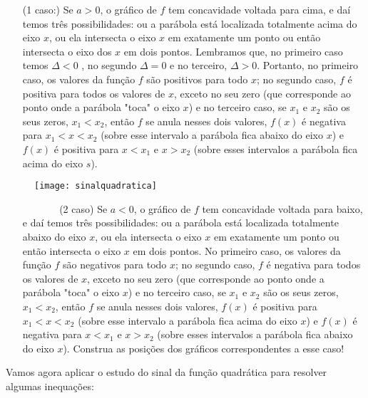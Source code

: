 \begin{itemize}


\item[(1\super{o} caso:)] Se $a>0$, o gráfico de $f$ tem concavidade voltada para cima, e daí temos três possibilidades: ou a parábola está localizada totalmente acima do eixo $x$, ou ela intersecta o eixo $x$ em exatamente um ponto ou então intersecta o eixo dos $x$ em dois pontos. Lembramos que, no primeiro caso temos $\Delta <0$ , no segundo $\Delta = 0$   e no terceiro, $\Delta >0$. Portanto, no primeiro caso, os valores da função $f$ são positivos para todo $x$; no segundo caso, $f$ é positiva para todos os valores de $x$, exceto no seu zero (que corresponde ao ponto onde a parábola "toca"{} o eixo $x$) e no terceiro caso, se $x_1$ e $x_2$ são os seus zeros, $x_1<x_2$, então $f$ se anula nesses dois valores, $f(x)$ é negativa para $x_1 < x < x_2$ (sobre esse intervalo a parábola fica abaixo do eixo $x$) e $f(x)$ é positiva para $x<x_1$ e $x> x_2$ (sobre esses intervalos a parábola fica acima do eixo $s$).


\end{itemize}

\begin{figure}[H]
\centering
\noindent\texttt{[image: sinalquadratica]}
\end{figure}

\begin{itemize}
\item[\textcolor{white}{............} (2\super{o} caso)] Se $a<0$, o gráfico de $f$ tem concavidade voltada para baixo, e daí temos três possibilidades: ou a parábola está localizada totalmente abaixo do eixo $x$, ou ela intersecta o eixo $x$ em exatamente um ponto ou então intersecta o eixo $x$ em dois pontos. No primeiro caso, os valores da função $f$ são negativos para todo $x$; no segundo caso, $f$ é negativa para todos os valores de $x$, exceto no seu zero (que corresponde ao ponto onde a parábola "toca"{} o eixo $x$) e no terceiro caso, se $x_1$ e $x_2$ são os seus zeros, $x_1<x_2$, então $f$ se anula nesses dois valores, $f(x)$ é positiva para $x_1 < x < x_2$ (sobre esse intervalo a parábola fica acima do eixo $x$) e $f(x)$ é negativa para $x<x_1$ e $x> x_2$ (sobre esses intervalos a parábola fica abaixo do eixo $x$). Construa as posições dos gráficos correspondentes a esse caso!


\end{itemize}
Vamos agora aplicar o estudo do sinal da função quadrática para resolver algumas inequações:

